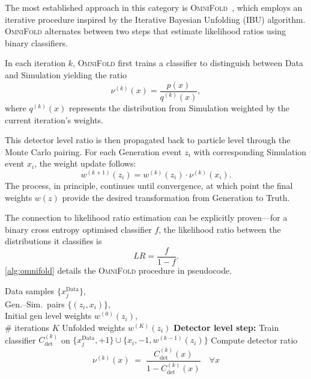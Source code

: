             The most established approach in this category is \textsc{OmniFold}~\cite{andreassen_omnifold_2020}, which employs an iterative procedure inspired by the Iterative Bayesian Unfolding (IBU) algorithm.
            \textsc{OmniFold} alternates between two steps that estimate likelihood ratios using binary classifiers.
            
            In each iteration \(k\), \textsc{OmniFold} first trains a classifier to distinguish between Data and Simulation yielding the ratio
            \begin{equation}
                \nu^{(k)}(x) = \frac{p(x)}{q^{(k)}(x)},
            \end{equation}
            where \(q^{(k)}(x)\) represents the distribution from Simulation weighted by the current iteration's weights.

            This detector level ratio is then propagated back to particle level through the Monte Carlo pairing.
            For each Generation event \(z_i\) with corresponding Simulation event \(x_i\), the weight update follows:
            \begin{equation}
                w^{(k+1)}(z_i) = w^{(k)}(z_i) \cdot \nu^{(k)}(x_i).
            \end{equation}
            The process, in principle, continues until convergence, at which point the final weights \(w(z)\) provide the desired transformation from Generation to Truth.
            
            The connection to likelihood ratio estimation can be explicitly proven---for a binary cross entropy optimised classifier \(f\), the likelihood ratio between the distributions it classifies is
            \[
                LR = \frac{f}{1-f}.
            \]
            \cref{alg:omnifold} details the \textsc{OmniFold} procedure in pseudocode.


\begin{algorithm}
  \caption{\textsc{OmniFold}}
  \label{alg:omnifold}
  \begin{algorithmic}[1]
  \algospacing
    \Require 
      Data samples $\{x_j^{\mathrm{Data}}\}$,\\
      Gen.--Sim.\ pairs $\{(z_i,x_i)\}$,\\
      Initial gen level weights $w^{(0)}(z_i)$,\\
      \# iterations $K$
    \Ensure 
      Unfolded weights $w^{(K)}(z_i)$
      \State \textbf{Detector level step:}
      \State Train classifier $C_{\text{det}}^{(k)}$ on
        $\{x_j^{\mathrm{Data}},+1\}\cup\{x_i,-1,w^{(k-1)}(z_i)\}$
      \State Compute detector ratio
        \[
          \nu^{(k)}(x)\;=\;\frac{C_{\text{det}}^{(k)}(x)}{1 - C_{\text{det}}^{(k)}(x)}
          \quad\forall x
        \]
    \EndFor
    \end{algorithmic}
\end{algorithm}

